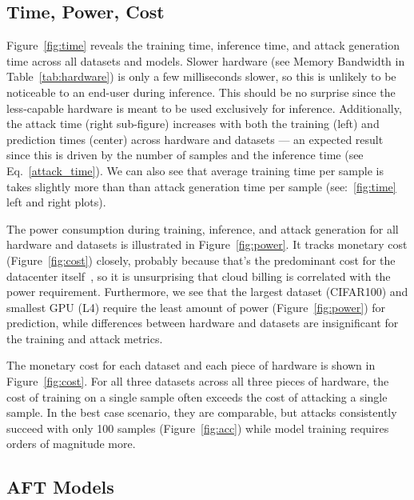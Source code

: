 \documentclass[conference]{IEEEtran}
\begin{document}
{\subsection{Time, Power, Cost}
\label{res:cost}

Figure~\ref{fig:time} reveals the training time, inference time, and attack generation time across all datasets and models. Slower hardware (see Memory Bandwidth in Table~\ref{tab:hardware}) is only a few milliseconds slower, so this is unlikely to be noticeable to an end-user during inference. This should be no surprise since the less-capable hardware is meant to be used exclusively for inference. Additionally, the attack time (right sub-figure) increases with both the training (left) and prediction times (center) across hardware and datasets --- an expected result since this is driven by the number of samples and the inference time (see Eq.~\ref{attack_time}). We can also see that average training time per sample is takes slightly more than than attack generation time per sample (see:~\ref{fig:time} left and right plots).

The power consumption during training, inference, and attack generation for all hardware and datasets is illustrated in Figure~\ref{fig:power}. It tracks monetary cost (Figure~\ref{fig:cost}) closely, probably because that's the predominant cost for the datacenter itself~\cite{dayarathna2015data}, so it is unsurprising that cloud billing is correlated with the power requirement. Furthermore, we see that the largest dataset (CIFAR100) and smallest GPU (L4) require the least amount of power (Figure~\ref{fig:power}) for prediction, while differences between hardware and datasets are insignificant for the training and attack metrics. 

The monetary cost for each dataset and each piece of hardware is shown in Figure~\ref{fig:cost}. For all three datasets across all three pieces of hardware, the cost of training on a single sample often exceeds the cost of attacking a single sample. In the best case scenario, they are comparable, but attacks consistently succeed with only 100 samples (Figure~\ref{fig:acc}) while model training requires orders of magnitude more. 



\subsection{AFT Models}
\label{res:aft}

}
\end{document}

